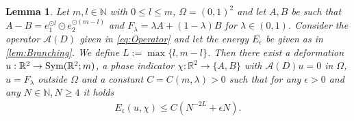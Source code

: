 \documentclass[a4paper, 10pt, twoside, notitlepage]{amsart}
\theoremstyle{plain}
\newtheorem{lem}[prop]{Lemma}
\newcommand{\R}{\mathbb{R}}
\newcommand{\N}{\mathbb{N}}
\newcommand{\A}{\mathcal{A}}
\begin{document}
		\begin{lem} \label{lem:Intermediate} Let $m,l \in \N$ with $0\leq l \leq m$, $\Omega = (0,1)^2$ and let $A,B$ be such that $A-B = e_1^{\odot l } \odot e_2^{\odot (m-l)}$ and $F_\lambda= \lambda A + (1-\lambda) B$ for
			$\lambda \in (0,1)$.  Consider the operator $\A(D)$ given in \eqref{eq:Operator} and let the energy $E_{\epsilon}$ be given as in \cref{lem:Branching}.  We define $L := \max \{l,m-l\}$.  Then there
			exist a deformation $u: \R^2 \to \textup{Sym}(\R^2;m)$, a phase indicator $\chi:\R^2 \to \{A,B\}$ with $\A(D)u = 0$ in $\Omega$, $u = F_\lambda$ outside $\Omega$ and a constant
				$C = C(m,\lambda)>0$ such that for any $\epsilon >0$ and any $N \in \N, N \geq 4$ it holds
			\begin{align*}
				E_{\epsilon}(u,\chi) \leq C(N^{-2L} + \epsilon N).
			\end{align*}
		\end{lem}
		
\end{document}
